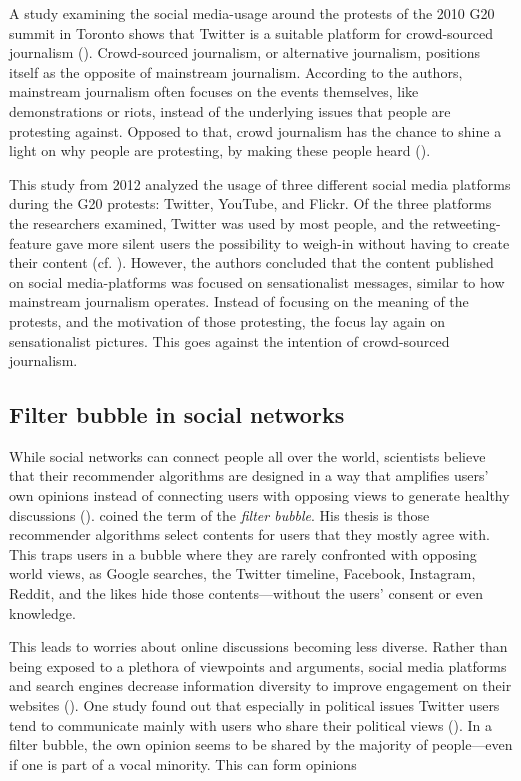 A study examining the social media-usage around the protests of the 2010 G20 summit in Toronto shows that Twitter is a suitable platform for crowd-sourced journalism (\cite{poell2012twitter}). Crowd-sourced journalism, or alternative journalism, positions itself as the opposite of mainstream journalism. According to the authors, mainstream journalism often focuses on the events themselves, like demonstrations or riots, instead of the underlying issues that people are protesting against. Opposed to that, crowd journalism has the chance to shine a light on why people are protesting, by making these people heard (\cite[698]{poell2012twitter}). 

This study from 2012 analyzed the usage of three different social media platforms during the G20 protests: Twitter, YouTube, and Flickr. Of the three platforms the researchers examined, Twitter was used by most people, and the retweeting-feature gave more silent users the possibility to weigh-in without having to create their content (cf. \cite[709]{poell2012twitter}). However, the authors concluded that the content published on social media-platforms was focused on sensationalist messages, similar to how mainstream journalism operates. Instead of focusing on the meaning of the protests, and the motivation of those protesting, the focus lay again on sensationalist pictures. This goes against the intention of crowd-sourced journalism.

\subsection{Filter bubble in social networks}
While social networks can connect people all over the world, scientists believe that their recommender algorithms are designed in a way that amplifies users' own opinions instead of connecting users with opposing views to generate healthy discussions (\cite{pariser2011filter}). \citeauthor{pariser2011filter} coined the term of the \emph{filter bubble}. His thesis is those recommender algorithms select contents for users that they mostly agree with. This traps users in a bubble where they are rarely confronted with opposing world views, as Google searches, the Twitter timeline, Facebook, Instagram, Reddit, and the likes hide those contents---without the users' consent or even knowledge.

This leads to worries about online discussions becoming less diverse. Rather than being exposed to a plethora of viewpoints and arguments, social media platforms and search engines decrease information diversity to improve engagement on their websites (\cite{bozdagBreakingFilterBubble2015}). One study found out that especially in political issues Twitter users tend to communicate mainly with users who share their political views (\cite{barberaTweetingLeftRight2015}). In a filter bubble, the own opinion seems to be shared by the majority of people---even if one is part of a vocal minority. This can form opinions 

